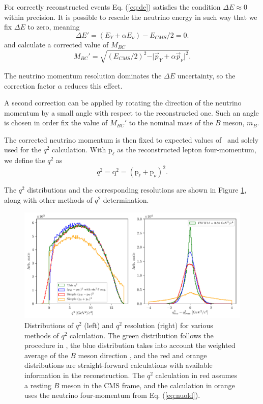 For correctly reconstructed events Eq. (\ref{eq:de}) satisfies the condition $\Delta E \approx 0$ within precision. It is possible to rescale the neutrino energy in such way that we fix $\Delta E$ to zero, meaning 
\begin{equation}
\Delta E' = (E_Y + \alpha E_\nu) - E_{CMS}/2 = 0.
\end{equation}
and calculate a corrected value of $M_{BC}$
\begin{equation}
M_{BC}' = \sqrt{\left(E_{CMS}/2\right)^2 - \vert \vec{p}_Y + \alpha \vec{p}_\nu \vert^2}.
\end{equation}

The neutrino momentum resolution dominates the $\Delta E$ uncertainty, so the correction factor $\alpha$ reduces this effect.

A second correction can be applied by rotating the direction of the neutrino momentum by a small angle with respect to the reconstructed one. Such an angle is chosen in order fix the value of $M_{BC}'$ to the nominal mass of the $B$ meson, $m_B$.

The corrected neutrino momentum is then fixed to expected values of \vars~and solely used for the $q^2$ calculation. With $\mathrm{p}_\ell$ as the reconstructed lepton four-momentum, we define the $q^2$ as
\begin{equation}
\label{eq:q2}
q^2 = \mathrm{q}^2 = \left(\mathrm{p}_\ell + \mathrm{p}_\nu \right)^2.
\end{equation}

The $q^2$ distributions and the corresponding resolutions are shown in Figure \ref{fig:q2}, along with other methods of $q^2$ determination.
\begin{figure}[H]
	\centering
	\captionsetup{width=0.8\linewidth}
	\includegraphics[width=\linewidth]{fig/q2}
	\caption{Distributions of $q^2$ (left) and $q^2$ resolution (right) for various methods of $q^2$ calculation. The green distribution follows the procedure in \cite{VubCLEO}, the blue distribution takes into account the weighted average of the $B$ meson direction \cite{Ha:2010rf}, and the red and orange distributions are straight-forward calculations with available information in the reconstruction. The $q^2$ calculation in red assumes a resting $B$ meson in the CMS frame, and the calculation in orange uses the neutrino four-momentum from Eq. (\ref{eq:nuold}).}
	\label{fig:q2}
\end{figure}

